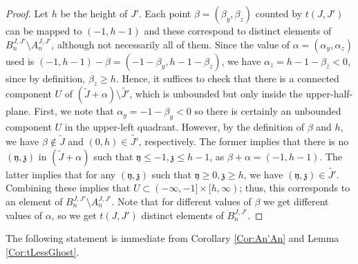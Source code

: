 \documentclass[11pt,a4paper,leqno,noamsfonts]{amsart}
\numberwithin{equation}{section}
\newcommand{\Fy}{{\mathfrak{y}}}
\newcommand{\Fz}{{\mathfrak{z}}}
\theoremstyle{definition}
\theoremstyle{thm}
\theoremstyle{ex}
\theoremstyle{sol}
\begin{document}
\begin{proof}

   Let $h$ be the height of $J'$. Each point $\beta=(\beta_y,\beta_z)$ counted by $t(J,J')$ can be mapped to $(-1,h-1)$ and these correspond to distinct elements of $B^{J,J'}_n\setminus A^{J,J'}_n$, although not necessarily all of them. Since the value of $\alpha=(\alpha_y,\alpha_z)$ used is $(-1,h-1)-\beta=(-1-\beta_y,h-1-\beta_z)$, we have $\alpha_z=h-1-\beta_z<0$, since by definition, $\beta_z\geq h$. Hence, it suffices to check that there is a connected component $U$ of $(\tilde{J}+\alpha)\setminus\tilde{J'}$, which is unbounded but only inside the upper-half-plane. First, we note that $\alpha_y=-1-\beta_y<0$ so there is certainly an unbounded component $U$ in the upper-left quadrant. However, by the definition of $\beta$ and $h$, we have $\beta\notin\tilde{J}$ and $(0,h)\in\tilde{J'}$, respectively. The former implies that there is no $(\Fy,\Fz)$ in $(\tilde{J}+\alpha)$ such that $\Fy\leq-1,\Fz\leq h-1$, as $\beta+\alpha=(-1,h-1)$. The latter implies that for any $(\Fy,\Fz)$ such that $\Fy\geq 0,\Fz\geq h$, we have $(\Fy,\Fz)\in\tilde{J'}$. Combining these implies that $U\subset (-\infty,-1]\times[h,\infty)$; thus, this corresponds to an element of $B^{J,J'}_n\setminus A^{J,J'}_n$. Note that for different values of $\beta$ we get different values of $\alpha$, so we get $t(J,J')$ distinct elements of $B^{J,J'}_n$.
\end{proof}

The following statement is immediate from Corollary \ref{Cor:An'An} and Lemma \ref{Cor:tLessGhost}. 
\end{document}
